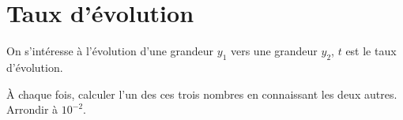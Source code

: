\newpage

\section{Taux d'évolution}
On s'intéresse à l'évolution d'une grandeur $y_1$ vers une grandeur $y_2$, $t$ est le taux d'évolution.

\`A chaque fois, calculer l'un des ces trois nombres en connaissant les deux autres.
Arrondir à $10^{-2}$.

\begin{questions}
	\question[4] 
\end{questions}


